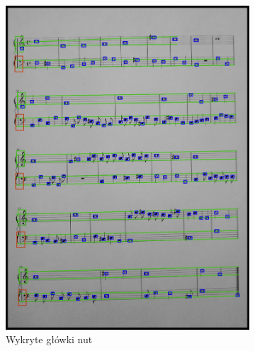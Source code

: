 \documentclass[12pt]{article}
\begin{document}
\begin{figure}[h!]
\begin{subfigure}[b]{0.32\linewidth}
				\includegraphics[width=\linewidth]{zdj/step_2.jpg}
				\caption{Wykryte główki nut}
			\end{subfigure}
			\begin{subfigure}[b]{0.32\linewidth}

\end{subfigure}
\end{figure}
\end{document}
